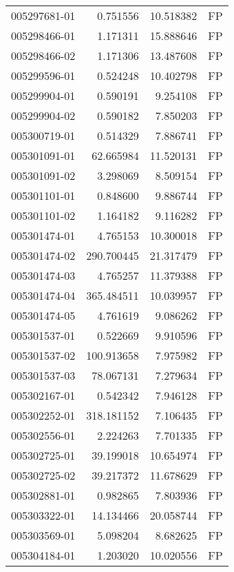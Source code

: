 \begin{tabular}{lrrl}
005297681-01 &    0.751556 &      10.518382 &   FP \\
005298466-01 &    1.171311 &      15.888646 &   FP \\
005298466-02 &    1.171306 &      13.487608 &   FP \\
005299596-01 &    0.524248 &      10.402798 &   FP \\
005299904-01 &    0.590191 &       9.254108 &   FP \\
005299904-02 &    0.590182 &       7.850203 &   FP \\
005300719-01 &    0.514329 &       7.886741 &   FP \\
005301091-01 &   62.665984 &      11.520131 &   FP \\
005301091-02 &    3.298069 &       8.509154 &   FP \\
005301101-01 &    0.848600 &       9.886744 &   FP \\
005301101-02 &    1.164182 &       9.116282 &   FP \\
005301474-01 &    4.765153 &      10.300018 &   FP \\
005301474-02 &  290.700445 &      21.317479 &   FP \\
005301474-03 &    4.765257 &      11.379388 &   FP \\
005301474-04 &  365.484511 &      10.039957 &   FP \\
005301474-05 &    4.761619 &       9.086262 &   FP \\
005301537-01 &    0.522669 &       9.910596 &   FP \\
005301537-02 &  100.913658 &       7.975982 &   FP \\
005301537-03 &   78.067131 &       7.279634 &   FP \\
005302167-01 &    0.542342 &       7.946128 &   FP \\
005302252-01 &  318.181152 &       7.106435 &   FP \\
005302556-01 &    2.224263 &       7.701335 &   FP \\
005302725-01 &   39.199018 &      10.654974 &   FP \\
005302725-02 &   39.217372 &      11.678629 &   FP \\
005302881-01 &    0.982865 &       7.803936 &   FP \\
005303322-01 &   14.134466 &      20.058744 &   FP \\
005303569-01 &    5.098204 &       8.682625 &   FP \\
005304184-01 &    1.203020 &      10.020556 &   FP \\

\end{tabular}
